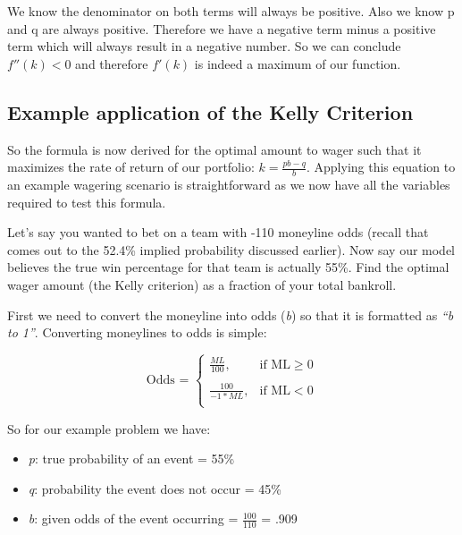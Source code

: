 \documentclass [MS] {uclathes}
\begin{document}
We know the denominator on both terms will always be positive. Also we know p and q are always positive. Therefore we have a negative term minus a positive term which will always result in a negative number. So we can conclude $f''(k) < 0$ and therefore $f'(k)$ is indeed a maximum of our function.

\subsection{Example application of the Kelly Criterion}
So the formula is now derived for the optimal amount to wager such that it maximizes the rate of return of our portfolio: $k = \frac{pb-q}{b}$. Applying this equation to an example wagering scenario is straightforward as we now have all the variables required to test this formula.

Let's say you wanted to bet on a team with -110 moneyline odds (recall that comes out to the 52.4\% implied probability discussed earlier). Now say our model believes the true win percentage for that team is actually 55\%. Find the optimal wager amount (the Kelly criterion) as a fraction of your total bankroll.

First we need to convert the moneyline into odds (\emph{b}) so that it is formatted as \emph{``b to 1''}. Converting moneylines to odds is simple:

\begin{center}
\begin{equation} \label{ml_to_odds}
\text{Odds = }
\begin{cases}
\displaystyle
 \frac{ML}
 {100},  & \text{if ML} \geq 0 \\ \\ 
\displaystyle
 \frac{100}
 {-1 * ML}, &  \text{if ML} <  0\\ 
\end{cases}
\end{equation}
\end{center}

So for our example problem we have:
\begin{itemize}
  \setlength\itemsep{-0.75em}
\item \emph{p}: true probability of an event = 55\%
\item \emph{q}: probability the event does not occur  = 45\%
\item \emph{b}: given odds of the event occurring = $\frac{100}{110}$ = .909
\end{itemize}
\end{document}
